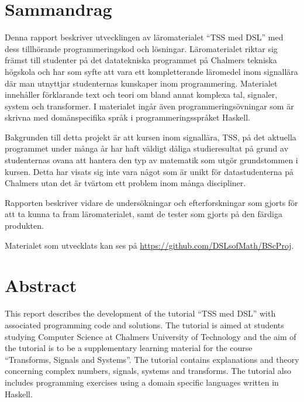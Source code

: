 \documentclass[12pt,a4paper,twoside,openright]{article}
\begin{document}
\thispagestyle{plain}

\section*{Sammandrag}
Denna rapport beskriver utvecklingen av läromaterialet ``TSS med DSL'' med dess
tillhörande programmeringskod och lösningar. Läromaterialet riktar sig främst
till studenter på det datatekniska programmet på Chalmers tekniska högskola och har som syfte att
vara ett kompletterande läromedel inom signallära där man utnyttjar studenternas
kunskaper inom programmering. Materialet innehåller förklarande text och teori
om bland annat komplexa tal, signaler, system och transformer. I materialet
ingår även programmeringsövningar som är skrivna med domänspecifika språk i
programmeringsspråket \gls{Haskell}.

Bakgrunden till detta projekt är att kursen inom signallära, TSS, på det
aktuella programmet under många år har haft väldigt dåliga studieresultat på
grund av studenternas ovana att hantera den typ av matematik som utgör
grundstommen i kursen. Detta har visats sig inte vara något som är unikt
för datastudenterna på Chalmers utan det är tvärtom ett problem inom många
discipliner.

Rapporten beskriver vidare de undersökningar och efterforskningar som gjorts
för att ta kunna ta fram läromaterialet, samt de tester som gjorts på den
färdiga produkten.

Materialet som utvecklats kan ses på \url{https://github.com/DSLsofMath/BScProj}.

\newpage

\thispagestyle{plain}

\section*{Abstract}
This report describes the development of the tutorial ``TSS med DSL'' with
associated programming code and solutions. The tutorial is aimed at students
studying Computer Science at Chalmers University of Technology and the aim of
the tutorial is to be a supplementary learning material for the course
``Transforms, Signals and Systems''. The tutorial contains explanations and
theory concerning complex numbers, signals, systems and transforms. The
tutorial also includes programming exercises using a domain specific languages
written in Haskell.
\end{document}
